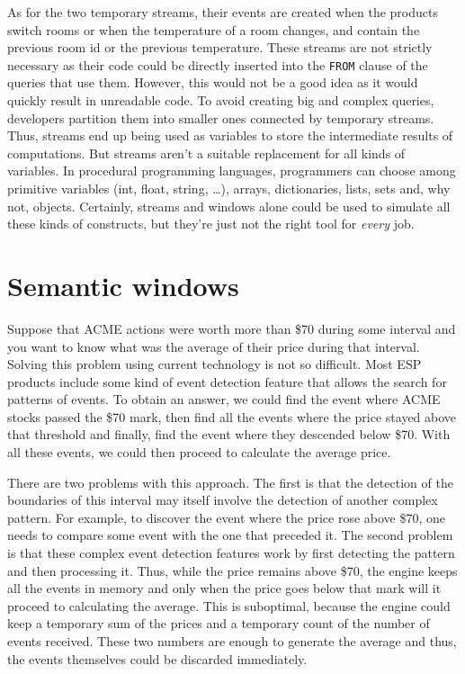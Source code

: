 \documentclass[a4,11pt]{report}
\begin{document}
As for the two temporary streams, their events are created when the
products switch rooms or when the temperature of a room changes, and
contain the previous room id or the previous temperature. These
streams are not strictly necessary as their code could be directly
inserted into the \verb=FROM= clause of the queries that use
them. However, this would not be a good idea as it would quickly
result in unreadable code. To avoid creating big and complex queries,
developers partition them into smaller ones connected by temporary
streams. Thus, streams end up being used as variables to store the
intermediate results of computations. But streams aren't a suitable
replacement for all kinds of variables. In procedural programming
languages, programmers can choose among primitive variables (int,
float, string, \dots), arrays, dictionaries, lists, sets and, why not,
objects. Certainly, streams and windows alone could be used to
simulate all these kinds of constructs, but they're just not the right
tool for \emph{every} job.


\section{Semantic windows}
\label{sec:result-while}

Suppose that ACME actions were worth more than \$70 during some
interval and you want to know what was the average of their price
during that interval. Solving this problem using current technology is
not so difficult. Most ESP products include some kind of event
detection feature that allows the search for patterns of events. To
obtain an answer, we could find the event where ACME stocks passed the
\$70 mark, then find all the events where the price stayed above that
threshold and finally, find the event where they descended below
\$70. With all these events, we could then proceed to calculate the
average price.

There are two problems with this approach. The first is that the
detection of the boundaries of this interval may itself involve the
detection of another complex pattern. For example, to discover the
event where the price rose above \$70, one needs to compare some event
with the one that preceded it. The second problem is that these
complex event detection features work by first detecting the pattern
and then processing it. Thus, while the price remains above \$70, the
engine keeps all the events in memory and only when the price goes
below that mark will it proceed to calculating the average. This is
suboptimal, because the engine could keep a temporary sum of the
prices and a temporary count of the number of events received. These
two numbers are enough to generate the average and thus, the events
themselves could be discarded immediately.
\end{document}
